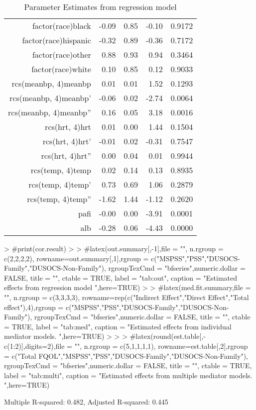 \documentclass{article}
\begin{document}
\begin{Schunk}
\begin{table}[ht]
\begin{tabular}{rrrrr}
$$  factor(race)black & -0.09 & 0.85 & -0.10 & 0.9172 \\ 
  factor(race)hispanic & -0.32 & 0.89 & -0.36 & 0.7172 \\ 
  factor(race)other & 0.88 & 0.93 & 0.94 & 0.3464 \\ 
  factor(race)white & 0.10 & 0.85 & 0.12 & 0.9033 \\ 
  rcs(meanbp, 4)meanbp & 0.01 & 0.01 & 1.52 & 0.1293 \\ 
  rcs(meanbp, 4)meanbp' & -0.06 & 0.02 & -2.74 & 0.0064 \\ 
  rcs(meanbp, 4)meanbp'' & 0.16 & 0.05 & 3.18 & 0.0016 \\ 
  rcs(hrt, 4)hrt & 0.01 & 0.00 & 1.44 & 0.1504 \\ 
  rcs(hrt, 4)hrt' & -0.01 & 0.02 & -0.31 & 0.7547 \\ 
  rcs(hrt, 4)hrt'' & 0.00 & 0.04 & 0.01 & 0.9944 \\ 
  rcs(temp, 4)temp & 0.02 & 0.14 & 0.13 & 0.8935 \\ 
  rcs(temp, 4)temp' & 0.73 & 0.69 & 1.06 & 0.2879 \\ 
  rcs(temp, 4)temp'' & -1.62 & 1.44 & -1.12 & 0.2620 \\ 
  pafi & -0.00 & 0.00 & -3.91 & 0.0001 \\ 
  alb & -0.28 & 0.06 & -4.43 & 0.0000 \\ 
   \hline
\end{tabular}
\caption{Parameter Estimates from regression model} 
\label{reg1}
\end{table}\begin{Sinput}
> #print(cor.result)
> 
> #latex(out.summary[,-1],file = "", n.rgroup = c(2,2,2,2), rowname=out.summary[,1],rgroup = c("MSPSS","PSS","DUSOCS-Family","DUSOCS-Non-Family"), rgroupTexCmd = "bfseries",numeric.dollar = FALSE, title = "", ctable = TRUE, label = "tab:out", caption = "Estimated  effects from regression model ",here=TRUE)
> 
> #latex(med.fit.summary,file = "", n.rgroup = c(3,3,3,3), rowname=rep(c("Indirect Effect","Direct Effect","Total effect"),4),rgroup = c("MSPSS","PSS","DUSOCS-Family","DUSOCS-Non-Family"), rgroupTexCmd = "bfseries",numeric.dollar = FALSE, title = "", ctable = TRUE, label = "tab:med", caption = "Estimated  effects from individual mediator models. ",here=TRUE)
> 
> 
> #latex(round(est.table[,-c(1:2)],digits=2),file = "", n.rgroup = c(5,1,1,1,1), rowname=est.table[,2],rgroup = c("Total FQOL","MSPSS","PSS","DUSOCS-Family","DUSOCS-Non-Family"), rgroupTexCmd = "bfseries",numeric.dollar = FALSE, title = "", ctable = TRUE, label = "tab:multi", caption = "Estimated  effects from multiple mediator models. ",here=TRUE)
\end{Sinput}
\end{Schunk}
Multiple R-squared:  0.482,	Adjusted R-squared:  0.445 
 
\end{document}
